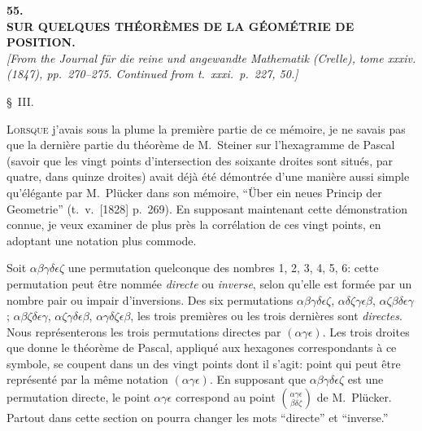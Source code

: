 \documentclass[11pt]{article}
\begin{document}
\bigskip

\begin{center}
\textbf{\large 55.}\\[0.7em]
\textbf{\large SUR QUELQUES TH\'EOR\`EMES DE LA G\'EOM\'ETRIE DE POSITION.}\\[0.5em]
\textit{[From the Journal f\"ur die reine und angewandte Mathematik (Crelle), tome xxxiv.\\
(1847), pp.~270--275. Continued from t.~xxxi.\ p.~227, 50.]}
\end{center}

\medskip
\begin{center}\S\ III.\end{center}

\smallskip
\noindent\textsc{Lorsque} j'avais sous la plume la premi\`ere partie de ce m\'emoire, je ne savais
pas que la derni\`ere partie du th\'eor\`eme de M.~Steiner sur l'hexagramme de Pascal
(savoir que les vingt points d'intersection des soixante droites sont situ\'es, par quatre,
dans quinze droites) avait d\'ej\`a \'et\'e d\'emontr\'ee d'une mani\`ere aussi simple qu'\'el\'egante
par M.~Pl\"ucker dans son m\'emoire, ``\"Uber ein neues Princip der Geometrie'' (t.~v.\ [1828]
p.~269). En supposant maintenant cette d\'emonstration connue, je veux examiner de
plus pr\`es la corr\'elation de ces vingt points, en adoptant une notation plus commode.

\medskip
Soit $\alpha\beta\gamma\delta\epsilon\zeta$ une permutation quelconque des nombres 1, 2, 3, 4, 5, 6: cette permu\-tation
peut \^etre nomm\'ee \emph{directe} ou \emph{inverse}, selon qu'elle est form\'ee par un nombre pair
ou impair d'inversions. Des six permutations $\alpha\beta\gamma\delta\epsilon\zeta$, $\alpha\delta\zeta\gamma\epsilon\beta$, $\alpha\zeta\beta\delta\epsilon\gamma$;
$\alpha\beta\zeta\delta\epsilon\gamma$, $\alpha\zeta\gamma\delta\epsilon\beta$, $\alpha\gamma\delta\zeta\epsilon\beta$, les trois premi\`eres ou les trois derni\`eres sont \emph{directes}. Nous repr\'esenterons les
trois permutations directes par $(\alpha\gamma\epsilon)$. Les trois droites que donne le th\'eor\`eme de Pascal,
appliqu\'e aux hexagones correspondants \`a ce symbole, se coupent dans un des vingt
points dont il s'agit: point qui peut \^etre repr\'esent\'e par la m\^eme notation $(\alpha\gamma\epsilon)$. En
supposant que $\alpha\beta\gamma\delta\epsilon\zeta$ est une permutation directe, le point $\alpha\gamma\epsilon$ correspond au point
$\genfrac{(}{)}{0pt}{}{\alpha\gamma\epsilon}{\beta\delta\zeta}$ de M.~Pl\"ucker. Partout dans cette section on pourra changer les mots ``directe''
et ``inverse.''
\end{document}
